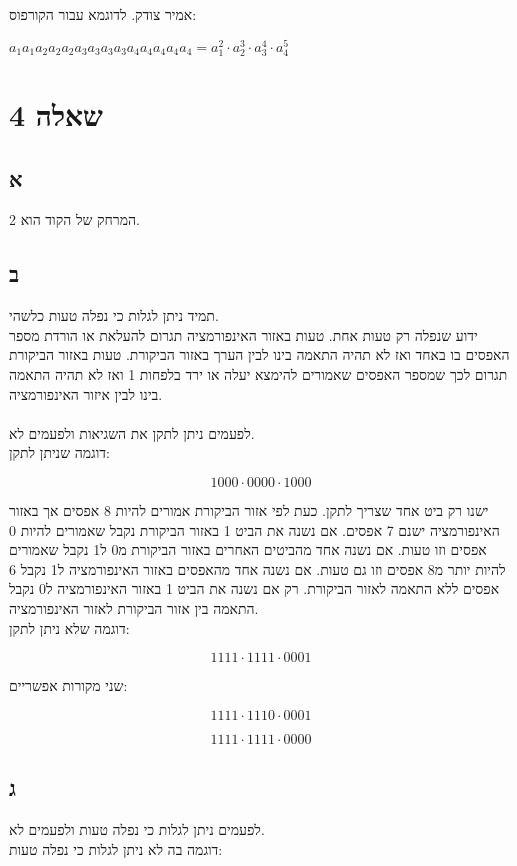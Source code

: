\documentclass{article}
\begin{document}
אמיר צודק. לדוגמא עבור הקורפוס:

$a_1 a_1 a_2 a_2 a_2 a_3 a_3 a_3 a_3 a_4 a_4 a_4 a_4 a_4 = a_1^2 \cdot a_2^3 \cdot a_3^4 \cdot a_4^5$

\section*{שאלה 4}

\subsection*{א}
המרחק של הקוד הוא 2.

\subsection*{ב}

תמיד ניתן לגלות כי נפלה טעות כלשהי.
\\
ידוע שנפלה רק טעות אחת.
טעות באזור האינפורמציה תגרום להעלאת או הורדת מספר האפסים בו באחד ואז לא תהיה התאמה בינו לבין הערך באזור הביקורת.
טעות באזור הביקורת תגרום לכך שמספר האפסים שאמורים להימצא יעלה או ירד בלפחות 1 ואז לא תהיה התאמה בינו לבין איזור האינפורמציה.
\\
\\
לפעמים ניתן לתקן את השגיאות ולפעמים לא.
\\
דוגמה שניתן לתקן:

$$1000 \cdot 0000 \cdot 1000$$

ישנו רק ביט אחד שצריך לתקן.
כעת לפי אזור הביקורת אמורים להיות 8 אפסים אך באזור האינפורמציה ישנם 7 אפסים.
אם נשנה את הביט 1 באזור הביקורת נקבל שאמורים להיות 0 אפסים וזו טעות.
אם נשנה אחד מהביטים האחרים באזור הביקורת מ0 ל1 נקבל שאמורים להיות יותר מ8 אפסים וזו גם טעות.
אם נשנה אחד מהאפסים באזור האינפורמציה ל1 נקבל 6 אפסים ללא התאמה לאזור הביקורת.
רק אם נשנה את הביט 1 באזור האינפורמציה ל0 נקבל התאמה בין אזור הביקורת לאזור האינפורמציה.
\\
דוגמה שלא ניתן לתקן:

$$1111 \cdot 1111 \cdot 0001$$

שני מקורות אפשריים:

$$1111 \cdot 1110 \cdot 0001$$

$$1111 \cdot 1111 \cdot 0000$$

\subsection*{ג}

לפעמים ניתן לגלות כי נפלה טעות ולפעמים לא.
\\
דוגמה בה לא ניתן לגלות כי נפלה טעות:
\end{document}
